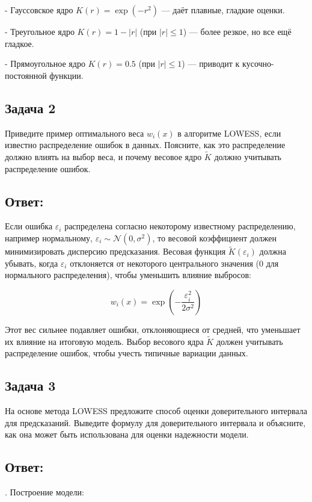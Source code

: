 - Гауссовское ядро \(K(r) = \exp(-r^2)\) — даёт плавные, гладкие оценки.

- Треугольное ядро \(K(r) = 1 - \lvert r \rvert\) (при \(\lvert r \rvert \leq 1\)) — более резкое, но все ещё гладкое.

- Прямоугольное ядро \(K(r) = 0.5\) (при \(\lvert r \rvert \leq 1\)) — приводит к кусочно-постоянной функции.

\subsection{Задача 2}
Приведите пример оптимального веса \(w_i(x)\) в алгоритме LOWESS, если известно распределение ошибок в данных. Поясните, как это распределение должно влиять на выбор веса, и почему весовое ядро \(\tilde{K}\) должно учитывать распределение ошибок.

\subsection{Ответ:}
Если ошибка \(\varepsilon_i\) распределена согласно некоторому известному распределению, например нормальному, \( \varepsilon_i \sim \mathcal{N}(0, \sigma^2)\), то весовой коэффициент должен минимизировать дисперсию предсказания. Весовая функция \(\tilde{K}(\varepsilon_i)\) должна убывать, когда \(\varepsilon_i\) отклоняется от некоторого центрального значения (0 для нормального распределения), чтобы уменьшить влияние выбросов:

\[
w_i(x) = \exp\left(-\frac{\varepsilon_i^2}{2\sigma^2}\right)
\]

Этот вес сильнее подавляет ошибки, отклоняющиеся от средней, что уменьшает их влияние на итоговую модель. Выбор весового ядра \(\tilde{K}\) должен учитывать распределение ошибок, чтобы учесть типичные вариации данных.

\subsection{Задача 3}
На основе метода LOWESS предложите способ оценки доверительного интервала для предсказаний. Выведите формулу для доверительного интервала и объясните, как она может быть использована для оценки надежности модели.

\subsection{Ответ:}

. Построение модели:

